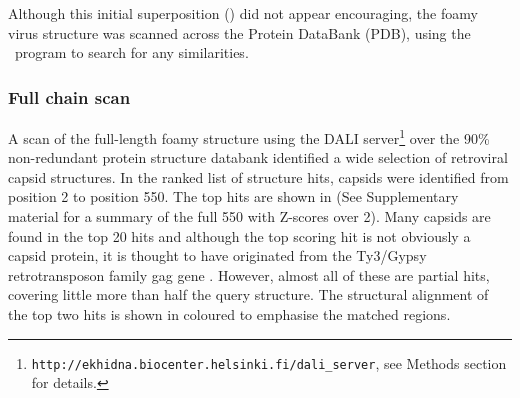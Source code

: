 Although this initial superposition () did not appear encouraging, the foamy virus structure
was scanned across the Protein DataBank (PDB), using the \DALI\ program \cite{HolmLet93a} to search for any similarities.

\subsubsection{Full chain scan}

A scan of the full-length foamy structure using the DALI server\footnote{
{\tt http://ekhidna.biocenter.helsinki.fi/dali\_server},
see Methods section for details.
}
over the 90\% non-redundant protein structure databank
identified a wide selection of retroviral capsid structures.  In the ranked list of structure hits,
capsids were identified from position 2 to position 550.
The top hits are shown in  (See Supplementary material for a summary of
the full 550 with Z-scores over 2).    Many capsids are found in the top 20 hits and although the top
scoring hit is not obviously a capsid protein, it is thought to have originated from the Ty3/Gypsy
retrotransposon family gag gene \cite{ZhangWet15}.   However, almost all of these are partial
hits, covering little more than half the query structure.   The structural alignment of the top two hits
is shown in  coloured to emphasise the matched regions.

